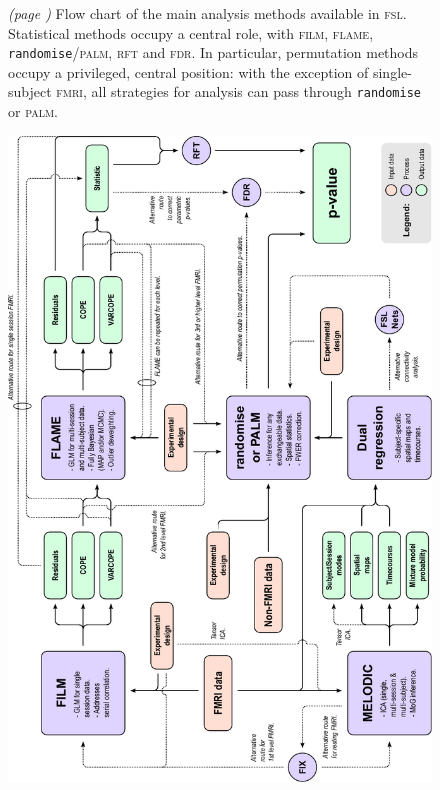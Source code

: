 \begin{figure}[!b]
\caption[Flow chart of the main analysis methods available in \textsc{fsl}.]{\emph{(page \pageref{fig:fsl_noref})} Flow chart of the main analysis methods available in \textsc{fsl}. Statistical methods occupy a central role, with \textsc{film}, \textsc{flame}, \texttt{randomise}/\textsc{palm}, \textsc{rft} and \textsc{fdr}. In particular, permutation methods occupy a privileged, central position: with the exception of single-subject \textsc{fmri}, all strategies for analysis can pass through \texttt{randomise} or \textsc{palm}.}
\label{fig:fsl}
\end{figure}

\begin{figure}[!p]
\begin{center}
\includegraphics[width=\textwidth]{figures/fsl.pdf}
\end{center}
\label{fig:fsl_noref}
\end{figure}

